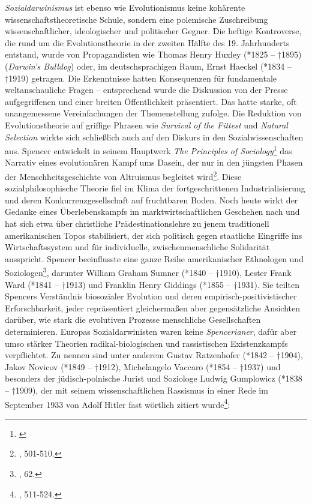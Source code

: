 \documentclass[openany,twoside,twocolumn]{book}
\let\rmarkdownfootnote\footnote%
\def\footnote{\protect\rmarkdownfootnote}
\begin{document}
\emph{Sozialdarwinismus} ist ebenso wie Evolutionismus keine kohärente
wissenschaftstheoretische Schule, sondern eine polemische Zuschreibung
wissenschaftlicher, ideologischer und politischer Gegner. Die heftige
Kontroverse, die rund um die Evolutionstheorie in der zweiten Hälfte des
19. Jahrhunderts entstand, wurde von Propagandisten wie Thomas Henry
Huxley (*1825 -- †1895) (\emph{Darwin's Bulldog}) oder, im
deutschsprachigen Raum, Ernst Haeckel (*1834 -- †1919) getragen. Die
Erkenntnisse hatten Konsequenzen für fundamentale weltanschauliche
Fragen -- entsprechend wurde die Diskussion von der Presse
aufgegriffenen und einer breiten Öffentlichkeit präsentiert. Das hatte
starke, oft unangemessene Vereinfachungen der Themenstellung zufolge.
Die Reduktion von Evolutionstheorie auf griffige Phrasen wie
\emph{Survival of the Fittest} und \emph{Natural Selection} wirkte sich
schließlich auch auf den Diskurs in den Sozialwissenschaften aus.
Spencer entwickelt in seinem Hauptwerk \emph{The Principles of
Sociology}\footnote{\textcite{SpencerHerbertSpencerPrinciples1898}} das
Narrativ eines evolutionären Kampf ums Dasein, der nur in den jüngsten
Phasen der Menschheitsgeschichte von Altruismus begleitet wird\footnote{\textcite{petermann_geschichte_2004},
  501-510.}. Diese sozialphilosophische Theorie fiel im Klima der
fortgeschrittenen Industrialisierung und deren Konkurrenzgesellschaft
auf fruchtbaren Boden. Noch heute wirkt der Gedanke eines
Überlebenskampfs im marktwirtschaftlichen Geschehen nach und hat sich
etwa über christliche Prädestinationslehre zu jenem traditionell
amerikanischen Topos stabilisiert, der sich politisch gegen staatliche
Eingriffe ins Wirtschaftssystem und für individuelle,
zwischenmenschliche Solidarität ausspricht. Spencer beeinflusste eine
ganze Reihe amerikanischer Ethnologen und Soziologen\footnote{\textcite{smith_cultural_1992},
  62.}, darunter William Graham Sumner (*1840 -- †1910), Lester Frank
Ward (*1841 -- †1913) und Franklin Henry Giddings (*1855 -- †1931). Sie
teilten Spencers Verständnis biosozialer Evolution und deren
empirisch-positivistischer Erforschbarkeit, jeder repräsentiert
gleichermaßen aber gegensätzliche Ansichten darüber, wie stark die
evolutiven Prozesse menschliche Gesellschaften determinieren. Europas
Sozialdarwinisten waren keine \emph{Spencerianer}, dafür aber umso
stärker Theorien radikal-biologischen und rassistischen Existenzkampfs
verpflichtet. Zu nennen sind unter anderem Gustav Ratzenhofer (*1842 --
†1904), Jakov Novicov (*1849 -- †1912), Michelangelo Vaccaro (*1854 --
†1937) und besonders der jüdisch-polnische Jurist und Soziologe Ludwig
Gumplowicz (*1838 -- †1909), der mit seinem wissenschaftlichen Rassismus
in einer Rede im September 1933 von Adolf Hitler fast wörtlich zitiert
wurde\footnote{\textcite{petermann_geschichte_2004}, 511-524.}:
\end{document}
